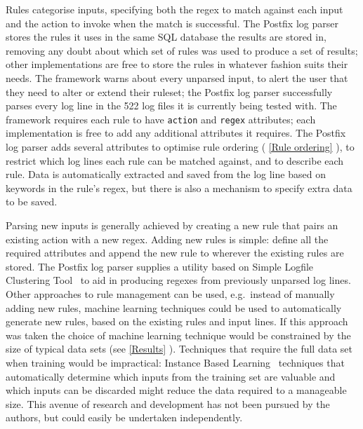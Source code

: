 \documentclass{svmult}
\newcommand{\sectionref}[1]{%
    \textsection{}\vref*{#1}%
}
\newcommand{\numberOFlogFILESall}[0]{%
    522%
}
\begin{document}
Rules categorise inputs, specifying both the regex to match against each
input and the action to invoke when the match is successful.  The Postfix
log parser stores the rules it uses in the same SQL database the results are stored
in, removing any doubt about which set of rules was used to produce a set
of results; other implementations are free to store the rules in whatever
fashion suits their needs.  The framework warns about every unparsed input,
to alert the user that they need to alter or extend their ruleset; the
Postfix log parser successfully parses every log line in the
\numberOFlogFILESall{} log files it is currently being tested with.  The
framework requires each rule to have \texttt{action} and \texttt{regex}
attributes; each implementation is free to add any additional attributes it
requires.  The Postfix log parser adds several attributes to optimise rule
ordering (\sectionref{Rule ordering}), to restrict which log lines each
rule can be matched against, and to describe each rule.  Data is
automatically extracted and saved from the log line based on keywords in
the rule's regex, but there is also a mechanism to specify extra data to be
saved.

Parsing new inputs is generally achieved by creating a new rule that pairs
an existing action with a new regex.  Adding new rules is simple: define
all the required attributes and append the new rule to wherever the
existing rules are stored.  The Postfix log parser supplies a utility based
on Simple Logfile Clustering Tool~\cite{slct-paper} to aid in producing
regexes from previously unparsed log lines.  Other approaches to rule
management can be used, e.g.\ instead of manually adding new rules, machine
learning techniques could be used to automatically generate new rules,
based on the existing rules and input lines.  If this approach was taken
the choice of machine learning technique would be constrained by the size
of typical data sets (see \sectionref{Results}).  Techniques that require
the full data set when training would be impractical: Instance Based
Learning~\cite{instance-based-learning} techniques that automatically
determine which inputs from the training set are valuable and which inputs
can be discarded might reduce the data required to a manageable
size.  This avenue of research and development has not been pursued by the
authors, but could easily be undertaken independently.
\end{document}
